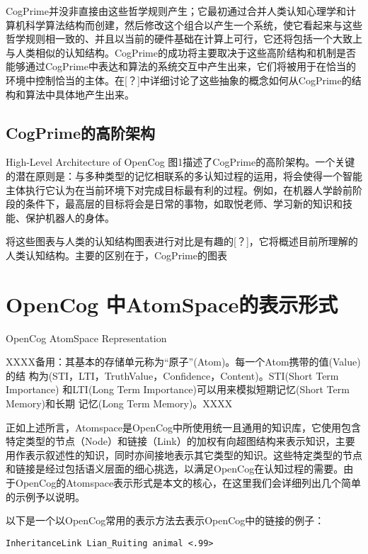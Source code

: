 CogPrime并没非直接由这些哲学规则产生；它最初通过合并人类认知心理学和计算机科学算法结构而创建，然后修改这个组合以产生一个系统，使它看起来与这些哲学规则相一致的、并且以当前的硬件基础在计算上可行，它还将包括一个大致上与人类相似的认知结构。CogPrime的成功将主要取决于这些高阶结构和机制是否能够通过CogPrime中表达和算法的系统交互中产生出来，它们将被用于在恰当的环境中控制恰当的主体。在[？]中详细讨论了这些抽象的概念如何从CogPrime的结构和算法中具体地产生出来。

\subsection{CogPrime的高阶架构}{High-Level Architecture of OpenCog}
图1描述了CogPrime的高阶架构。一个关键的潜在原则是：与多种类型的记忆相联系的多认知过程的运用，将会使得一个智能主体执行它认为在当前环境下对完成目标最有利的过程。例如，在机器人学龄前阶段的条件下，最高层的目标将会是日常的事物，如取悦老师、学习新的知识和技能、保护机器人的身体。

将这些图表与人类的认知结构图表进行对比是有趣的[？]，它将概述目前所理解的人类认知结构。主要的区别在于，CogPrime的图表


\section{OpenCog 中AtomSpace的表示形式}{OpenCog AtomSpace Representation}
\label{sec:atoms}

XXXX备用：其基本的存储单元称为“原子”(Atom)。每一个Atom携带的值(Value)的结
构为(STI，LTI，TruthValue，Confidence，Content)。STI(Short Term Importance)
和LTI(Long Term Importance)可以用来模拟短期记忆(Short Term Memory)和长期
记忆(Long Term Memory)。XXXX

正如上述所言，Atomspace是OpenCog中所使用统一且通用的知识库，它使用包含特定类型的节点（Node）和链接（Link）的加权有向超图结构来表示知识，主要用作表示叙述性的知识，同时亦间接地表示其它类型的知识。这些特定类型的节点和链接是经过包括语义层面的细心挑选，以满足OpenCog在认知过程的需要。由于OpenCog的Atomspace表示形式是本文的核心，在这里我们会详细列出几个简单的示例予以说明。

以下是一个以OpenCog常用的表示方法去表示OpenCog中的链接的例子：
 
 \begin{verbatim}
InheritanceLink Lian_Ruiting animal <.99>
\end{verbatim}


